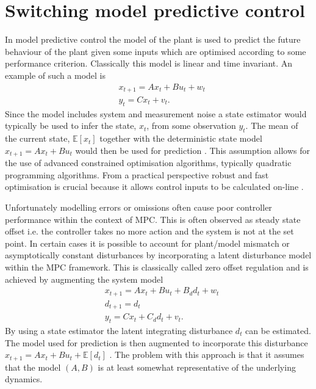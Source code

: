 \section{Switching model predictive control}
\label{sec_switch_mpc_lit}
In model predictive control the model of the plant is used to predict the future behaviour of the plant given some inputs which are optimised according to some performance criterion. Classically this model is linear and time invariant. An example of such a model is 
\begin{equation}
\begin{aligned}
&x_{t+1} = Ax_t + Bu_t + w_t \\
&y_t = Cx_t + v_t.
\end{aligned}
\label{eq_mpc_nodisturbance_obs}
\end{equation} 
Since the model includes system and measurement noise a state estimator would typically be used to infer the state, $x_t$, from some observation $y_t$. The mean of the current state, $\mathbb{E}[x_t]$ together with the deterministic state model $x_{t+1} = Ax_t + Bu_t$ would then be used for prediction \cite{raw}. This assumption allows for the use of advanced constrained optimisation algorithms, typically quadratic programming algorithms. From a practical perspective robust and fast optimisation is crucial because it allows control inputs to be calculated on-line \cite{mac}.

Unfortunately modelling errors or omissions often cause poor controller performance within the context of MPC. This is often observed as steady state offset i.e. the controller takes no more action and the system is not at the set point. In certain cases it is possible to account for plant/model mismatch or asymptotically constant disturbances by incorporating a latent disturbance model within the MPC framework. This is classically called zero offset regulation \cite{raw} and is achieved by augmenting the system model
\begin{equation}
\begin{aligned}
&x_{t+1} = Ax_t + Bu_t + B_d d_t + w_t \\
&d_{t+1} = d_t\\
&y_t = Cx_t + C_d d_t + v_t.
\end{aligned}
\label{eq_mpc_disturbance_obs}
\end{equation}
By using a state estimator the latent integrating disturbance $d_t$ can be estimated. The model used for prediction is then augmented to incorporate this disturbance $x_{t+1} = Ax_t + Bu_t + \mathbb{E}[d_t]$ \cite{lee}. The problem with this approach is that it assumes that the model $(A, B)$ is at least somewhat representative of the underlying dynamics.

